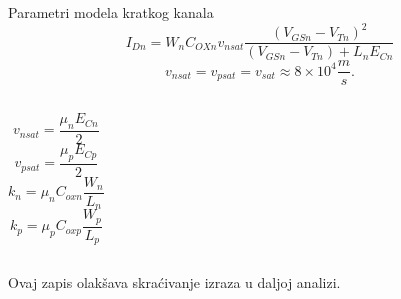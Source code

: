 \begin{frame}[label=09_1-s007]{Parametri modela kratkog kanala}\setlength{\parskip}{2pt}\setlength{\abovedisplayskip}{4pt}\setlength{\belowdisplayskip}{4pt}\setlength{\abovedisplayshortskip}{3pt}\setlength{\belowdisplayshortskip}{3pt}
\[I_{Dn}=W_nC_{OXn}v_{nsat}\frac{(V_{GSn}-V_{Tn})^2}{(V_{GSn}-V_{Tn})+L_nE_{Cn}}\]
\[v_{nsat}=v_{psat}=v_{sat}\approx8\times10^4\frac ms.\]
\begin{columns}[T,onlytextwidth]\[v_{nsat}=\frac{\mu_nE_{Cn}}2\]
\[v_{psat}=\frac{\mu_pE_{Cp}}2\]
\[k_n=\mu_nC_{oxn}\frac{W_n}{L_n}\]
\[k_p=\mu_pC_{oxp}\frac{W_p}{L_p}\]
\end{columns}\medskip Ovaj zapis olakšava skraćivanje izraza u daljoj analizi.
\end{frame}
